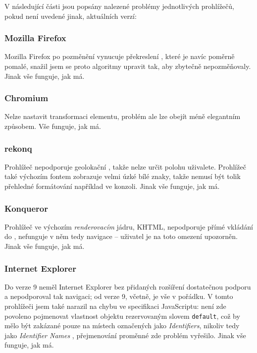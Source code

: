 V následující části jsou popsány nalezené problémy jednotlivých prohlížečů, pokud není uvedené jinak, aktuálních verzí:

\subsubsection{Mozilla Firefox}
Mozilla Firefox po pozměnění vynucuje překreslení , které je navíc poměrně pomalé, snažil jsem se proto algoritmy upravit tak, aby  zbytečně nepozměňovaly. Jinak vše funguje, jak má.

\subsubsection{Chromium}
Nelze nastavit transformaci  elementu, problém ale lze obejít méně elegantním způsobem. Vše funguje, jak má.

\subsubsection{rekonq}
Prohlížeč nepodporuje geolokační , takže nelze určit polohu uživalete. Prohlížeč také výchozím fontem zobrazuje velmi úzké bílé znaky, takže nemusí být tolik přehledné formátování například ve  konzoli. Jinak vše funguje, jak má.

\subsubsection{Konqueror}
Prohlížeč ve výchozím \textit{renderovacím} jádru, KHTML, nepodporuje přímé vkládání  do , nefunguje v něm tedy navigace -- uživatel je na toto omezení upozorněn. Jinak vše funguje, jak má.

\subsubsection{Internet Explorer}
Do verze 9 neměl Internet Explorer bez přidaných rozšíření dostatečnou podporu  a nepodporoval tak navigaci; od verze 9, včetně, je vše v pořádku. V tomto prohlížeči jsem také narazil na chybu ve specifikaci JavaScriptu: není zde povoleno pojmenovat vlastnost objektu rezervovaným slovem \texttt{default}, což by mělo být zakázané pouze na místech označených jako \textit{Identifiers}, nikoliv tedy jako \textit{Identifier Names} \cite{JsIdentifiers}, přejmenování proměnné zde problém vyřešilo. Jinak vše funguje, jak má.

